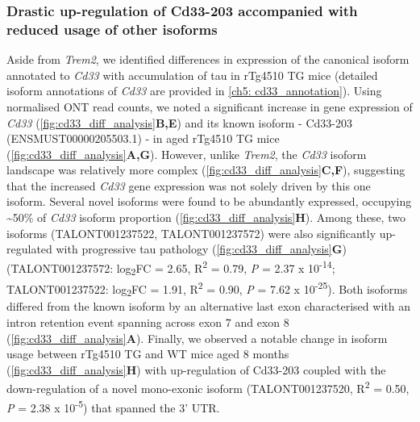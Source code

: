 \subsubsection{Drastic up-regulation of Cd33-203 accompanied with reduced usage of other isoforms}
\label{cd33_diff}
Aside from \textit{Trem2}, we identified differences in expression of the canonical isoform annotated to \textit{Cd33} with accumulation of tau in rTg4510 TG mice (detailed isoform annotations of \textit{Cd33} are provided in \cref{ch5: cd33_annotation}). Using normalised ONT read counts, we noted a significant increase in gene expression of \textit{Cd33} (\cref{fig:cd33_diff_analysis}\textbf{B,E}) and its known isoform - Cd33-203 (ENSMUST00000205503.1) - in aged rTg4510 TG mice (\cref{fig:cd33_diff_analysis}\textbf{A,G}). However, unlike \textit{Trem2}, the \textit{Cd33} isoform landscape was relatively more complex (\cref{fig:cd33_diff_analysis}\textbf{C,F}), suggesting that the increased \textit{Cd33} gene expression was not solely driven by this one isoform. Several novel isoforms were found to be abundantly expressed, occupying \textasciitilde50\% of \textit{Cd33} isoform proportion (\cref{fig:cd33_diff_analysis}\textbf{H}). Among these, two isoforms (TALONT001237522, TALONT001237572) were also significantly up-regulated with progressive tau pathology (\cref{fig:cd33_diff_analysis}\textbf{G}) (TALONT001237572: log\textsubscript{2}FC = 2.65, R\textsuperscript{2} = 0.79, \textit{P} = 2.37 x 10\textsuperscript{-14}; TALONT001237522: log\textsubscript{2}FC = 1.91, R\textsuperscript{2} = 0.90, \textit{P} = 7.62 x 10\textsuperscript{-25}). Both isoforms differed from the known isoform by an alternative last exon characterised with an intron retention event spanning across exon 7 and exon 8 (\cref{fig:cd33_diff_analysis}\textbf{A}). Finally, we observed a notable change in isoform usage between rTg4510 TG and WT mice aged 8 months (\cref{fig:cd33_diff_analysis}\textbf{H}) with up-regulation of Cd33-203 coupled with the down-regulation of a novel mono-exonic isoform (TALONT001237520,  R\textsuperscript{2} = 0.50, \textit{P} = 2.38 x 10\textsuperscript{-5}) that spanned the 3' UTR. 

  
